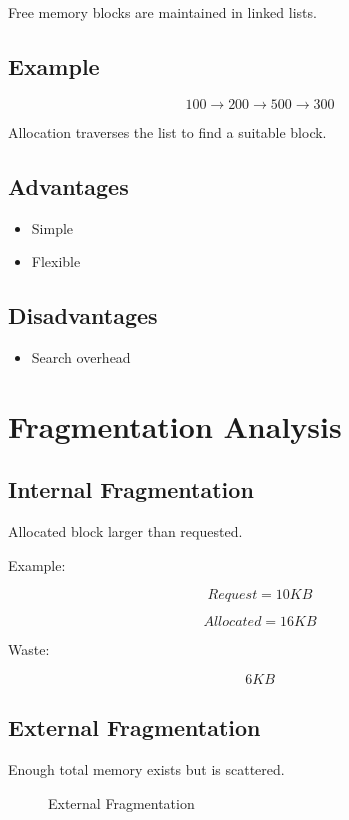 Free memory blocks are maintained in linked lists.

\subsection{Example}

\[
100 \rightarrow 200 \rightarrow 500 \rightarrow 300
\]

Allocation traverses the list to find a suitable block.

\subsection{Advantages}

\begin{itemize}
\item Simple
\item Flexible
\end{itemize}

\subsection{Disadvantages}

\begin{itemize}
\item Search overhead
\end{itemize}

\section{Fragmentation Analysis}

\subsection{Internal Fragmentation}

Allocated block larger than requested.

Example:

\[
Request=10KB
\]

\[
Allocated=16KB
\]

Waste:

\[
6KB
\]

\subsection{External Fragmentation}

Enough total memory exists but is scattered.

\begin{figure}[H]
\centering
{}
\caption{External Fragmentation}
\end{figure}

